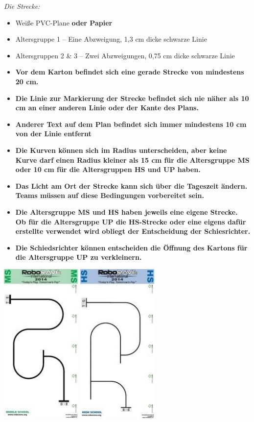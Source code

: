 \documentclass[a4paper,12pt]{article}
\begin{document}
\emph{Die Strecke:}
\begin{itemize}
	\item Weiße PVC-Plane \textbf{oder Papier}
	\item Altersgruppe 1 – Eine Abzweigung, 1,3 cm dicke schwarze Linie
	\item Altersgruppen 2 \& 3 – Zwei Abzweigungen, 0,75 cm dicke schwarze Linie
	\item \textbf{Vor dem Karton befindet sich eine gerade Strecke von mindestens 20 cm.}
	\item \textbf{Die Linie zur Markierung der Strecke befindet sich nie näher als 10 cm
	an einer anderen Linie oder der Kante des Plans.}
	\item \textbf{Anderer Text auf dem Plan befindet sich immer mindestens 10 cm von der Linie
	entfernt}
	\item \textbf{Die Kurven können sich im Radius unterscheiden, aber keine Kurve darf einen
	Radius kleiner als 15 cm für die Altersgruppe MS oder 10 cm für die Altersgruppen HS und UP haben.}
	\item \textbf{Das Licht am Ort der Strecke kann sich über die Tageszeit ändern. Teams müssen
	auf diese Bedingungen vorbereitet sein.}
	\item \textbf{Die Altersgruppe MS und HS haben jeweils eine eigene Strecke. Ob für die
	Altersgruppe UP die HS-Strecke oder eine eigens dafür erstellte verwendet wird obliegt der
	Entscheidung der Schiesrichter.}
	\item \textbf{ Die Schiedsrichter können entscheiden die Öffnung des Kartons für die
	Altersgruppe UP zu verkleinern.}
\end{itemize}
\includegraphics[width=0.3\textwidth]{track_ms_lf.png}
\includegraphics[width=0.3\textwidth]{track_hs_lf.png}
\end{document}
